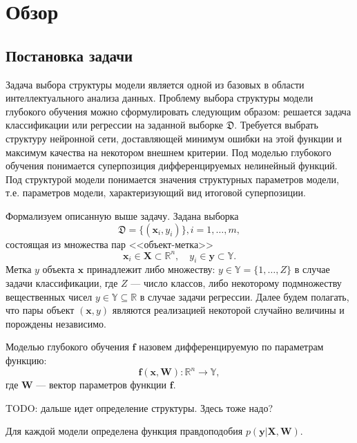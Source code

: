 \newpage{}
\chapter*{Обзор}
\section{Постановка задачи}
Задача выбора структуры модели является одной из базовых в области интеллектуального анализа данных.
Проблему выбора структуры модели глубокого обучения можно сформулировать следующим образом: решается задача классификации или регрессии на заданной выборке $\mathfrak{D}$. Требуется выбрать структуру нейронной сети, доставляющей минимум ошибки на этой функции и максимум качества на некотором внешнем критерии.
 Под моделью глубокого обучения понимается суперпозиция дифференцируемых нелинейный функций. Под структурой модели понимается значения структурных параметров модели, т.е. параметров модели, характеризующий вид итоговой суперпозиции. 

Формализуем описанную выше задачу.
Задана выборка \begin{equation}\label{eq:dataset}\mathfrak{D} = \{(\mathbf{x}_i,y_i)\}, i = 1,\dots,m,\end{equation} состоящая из множества пар <<объект-метка>> $$\mathbf{x}_i \in \mathbf{X} \subset \mathbb{R}^n, \quad {y}_i \in \mathbf{y} \subset \mathbb{Y}.$$ Метка ${y}$  объекта $\mathbf{x}$ принадлежит либо множеству: ${y} \in \mathbb{Y} = \{1, \dots, Z\}$ в случае задачи классификации, где $Z$ --- число классов, либо некоторому подмножеству вещественных чисел ${y} \in \mathbb{Y}  \subseteq \mathbb{R}$ в случае задачи регрессии. Далее будем полагать, что пары объект $(\mathbf{x}, y)$ являются реализацией некоторой случайно величины и порождены независимо.


\begin{defin}
Моделью глубокого обучения $\mathbf{f}$ назовем дифференцируемую по параметрам функцию:
\[
    \mathbf{f}(\mathbf{x}, \mathbf{W}): \mathbb{R}^n \to \mathbb{Y},
\]
где $\mathbf{W}$ --- вектор параметров функции $\mathbf{f}$.
\end{defin}

TODO: дальше идет определение структуры. Здесь тоже надо?

Для каждой модели определена функция правдоподобия  $p(\mathbf{y}|\mathbf{X}, \mathbf{W})$.
 

